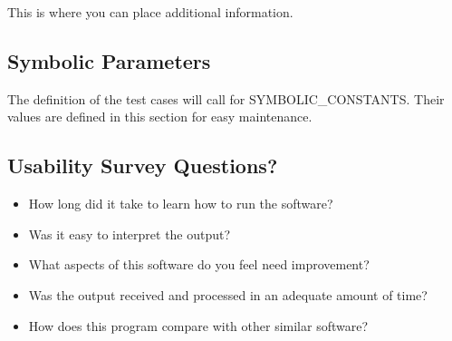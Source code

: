 \documentclass[12pt, titlepage]{article}
\begin{document}
This is where you can place additional information.

\subsection{Symbolic Parameters}

The definition of the test cases will call for SYMBOLIC\_CONSTANTS.
Their values are defined in this section for easy maintenance.

\subsection{Usability Survey Questions?}

\begin{itemize}
	\item How long did it take to learn how to run the software? 
	\item Was it easy to interpret the output? 
	\item What aspects of this software do you feel need improvement?
	\item Was the output received and processed in an 
	adequate amount of time?
	\item How does this program compare with other similar software?
\end{itemize} 

\end{document}
